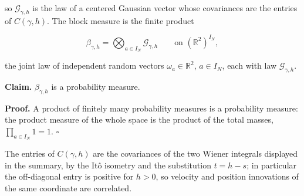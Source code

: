 \documentclass[11pt,a4paper]{article}
\begin{document}
so \(\mathcal G_{\gamma,h}\) is the law of a centered Gaussian vector whose covariances are the entries of \(C(\gamma,h)\). The block measure is the finite product


\[\beta_{\gamma,h}=\bigotimes_{a\in I_N}\mathcal G_{\gamma,h}\qquad\text{on }(\mathbb R^2)^{I_N},\]


the joint law of independent random vectors \(\omega_a\in\mathbb R^2\), \(a\in I_N\), each with law \(\mathcal G_{\gamma,h}\).




\textbf{Claim.} \(\beta_{\gamma,h}\) is a probability measure.




\textbf{Proof.} A product of finitely many probability measures is a probability measure: the product measure of the whole space is the product of the total masses, \(\prod_{a\in I_N}1=1\). \(\square\)




The entries of \(C(\gamma,h)\) are the covariances of the two Wiener integrals displayed in the summary, by the Itô isometry and the substitution \(t=h-s\); in particular the off-diagonal entry is positive for \(h>0\), so velocity and position innovations of the same coordinate are correlated.
\end{document}
